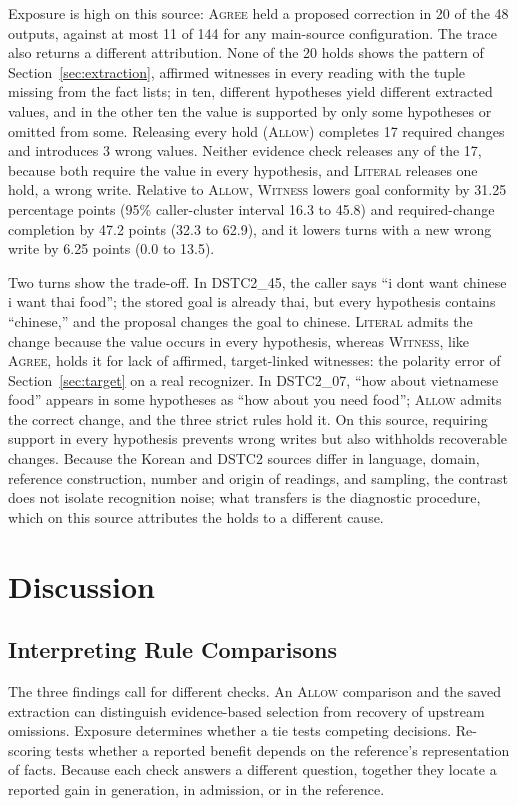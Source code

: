 \documentclass[acmsmall,review,anonymous]{acmart}
\newcommand{\agree}{\textsc{Agree}}
\newcommand{\allow}{\textsc{Allow}}
\newcommand{\literal}{\textsc{Literal}}
\newcommand{\witness}{\textsc{Witness}}
\begin{document}
Exposure is high on this source: \agree{} held a proposed correction in 20 of the 48 outputs, against at most 11 of 144 for any main-source configuration. The trace also returns a different attribution. None of the 20 holds shows the pattern of Section~\ref{sec:extraction}, affirmed witnesses in every reading with the tuple missing from the fact lists; in ten, different hypotheses yield different extracted values, and in the other ten the value is supported by only some hypotheses or omitted from some. Releasing every hold (\allow{}) completes 17 required changes and introduces 3 wrong values. Neither evidence check releases any of the 17, because both require the value in every hypothesis, and \literal{} releases one hold, a wrong write. Relative to \allow{}, \witness{} lowers goal conformity by 31.25 percentage points (95\% caller-cluster interval 16.3 to 45.8) and required-change completion by 47.2 points (32.3 to 62.9), and it lowers turns with a new wrong write by 6.25 points (0.0 to 13.5).

Two turns show the trade-off. In DSTC2\_45, the caller says ``i dont want chinese i want thai food''; the stored goal is already thai, but every hypothesis contains ``chinese,'' and the proposal changes the goal to chinese. \literal{} admits the change because the value occurs in every hypothesis, whereas \witness{}, like \agree{}, holds it for lack of affirmed, target-linked witnesses: the polarity error of Section~\ref{sec:target} on a real recognizer. In DSTC2\_07, ``how about vietnamese food'' appears in some hypotheses as ``how about you need food''; \allow{} admits the correct change, and the three strict rules hold it. On this source, requiring support in every hypothesis prevents wrong writes but also withholds recoverable changes. Because the Korean and DSTC2 sources differ in language, domain, reference construction, number and origin of readings, and sampling, the contrast does not isolate recognition noise; what transfers is the diagnostic procedure, which on this source attributes the holds to a different cause.

\section{Discussion}\label{sec:discussion}
\subsection{Interpreting Rule Comparisons}
The three findings call for different checks. An \allow{} comparison and the saved extraction can distinguish evidence-based selection from recovery of upstream omissions. Exposure determines whether a tie tests competing decisions. Re-scoring tests whether a reported benefit depends on the reference's representation of facts. Because each check answers a different question, together they locate a reported gain in generation, in admission, or in the reference.
\end{document}
